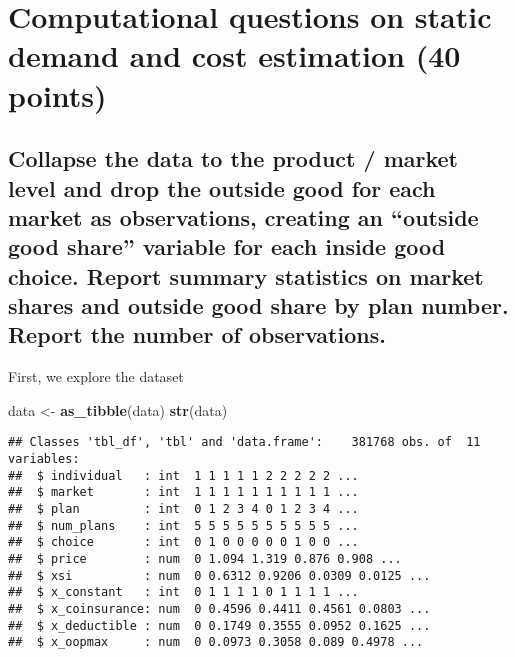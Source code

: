 \documentclass[]{article}
\newenvironment{Shaded}{\begin{snugshade}}{\end{snugshade}}
\newcommand{\KeywordTok}[1]{\textcolor[rgb]{0.13,0.29,0.53}{\textbf{#1}}}
\newcommand{\NormalTok}[1]{#1}
\newcommand{\StringTok}[1]{\textcolor[rgb]{0.31,0.60,0.02}{#1}}
\begin{document}
\hypertarget{computational-questions-on-static-demand-and-cost-estimation-40-points}{%
\section{Computational questions on static demand and cost estimation
(40
points)}\label{computational-questions-on-static-demand-and-cost-estimation-40-points}}

\hypertarget{collapse-the-data-to-the-product-market-level-and-drop-the-outside-good-for-each-market-as-observations-creating-an-outside-good-share-variable-for-each-inside-good-choice.-report-summary-statistics-on-market-shares-and-outside-good-share-by-plan-number.-report-the-number-of-observations.}{%
\subsection{Collapse the data to the product / market level and drop the
outside good for each market as observations, creating an ``outside good
share'' variable for each inside good choice. Report summary statistics
on market shares and outside good share by plan number. Report the
number of
observations.}\label{collapse-the-data-to-the-product-market-level-and-drop-the-outside-good-for-each-market-as-observations-creating-an-outside-good-share-variable-for-each-inside-good-choice.-report-summary-statistics-on-market-shares-and-outside-good-share-by-plan-number.-report-the-number-of-observations.}}

First, we explore the dataset

\begin{Shaded}
\begin{Highlighting}[]
\NormalTok{data <-}\StringTok{ }\KeywordTok{as_tibble}\NormalTok{(data)}
\KeywordTok{str}\NormalTok{(data)}
\end{Highlighting}
\end{Shaded}

\begin{verbatim}
## Classes 'tbl_df', 'tbl' and 'data.frame':    381768 obs. of  11 variables:
##  $ individual   : int  1 1 1 1 1 2 2 2 2 2 ...
##  $ market       : int  1 1 1 1 1 1 1 1 1 1 ...
##  $ plan         : int  0 1 2 3 4 0 1 2 3 4 ...
##  $ num_plans    : int  5 5 5 5 5 5 5 5 5 5 ...
##  $ choice       : int  0 1 0 0 0 0 0 1 0 0 ...
##  $ price        : num  0 1.094 1.319 0.876 0.908 ...
##  $ xsi          : num  0 0.6312 0.9206 0.0309 0.0125 ...
##  $ x_constant   : int  0 1 1 1 1 0 1 1 1 1 ...
##  $ x_coinsurance: num  0 0.4596 0.4411 0.4561 0.0803 ...
##  $ x_deductible : num  0 0.1749 0.3555 0.0952 0.1625 ...
##  $ x_oopmax     : num  0 0.0973 0.3058 0.089 0.4978 ...
\end{verbatim}
\end{document}
